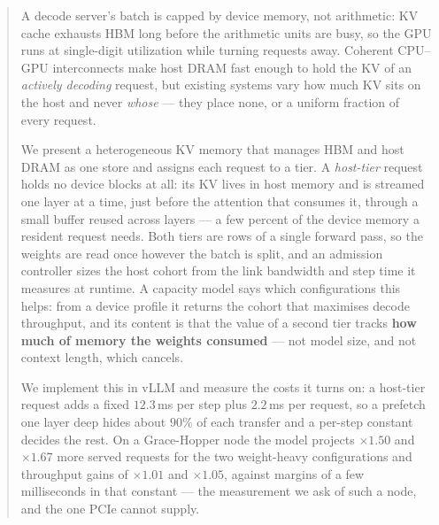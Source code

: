 \begin{abstract}
A decode server's batch is capped by device memory, not arithmetic: KV cache
exhausts HBM long before the arithmetic units are busy, so the GPU runs at
single-digit utilization while turning requests away. Coherent CPU--GPU
interconnects make host DRAM fast enough to hold the KV of an \emph{actively
decoding} request, but existing systems vary how much KV sits on the host and
never \emph{whose} --- they place none, or a uniform fraction of every request.

We present a heterogeneous KV memory that manages HBM and host DRAM as one store
and assigns each request to a tier. A \emph{host-tier} request holds no device
blocks at all: its KV lives in host memory and is streamed one layer at a time,
just before the attention that consumes it, through a small buffer reused across
layers --- a few percent of the device memory a resident request needs. Both tiers
are rows of a single forward pass, so the weights are read once however the batch
is split, and an admission controller sizes the host cohort from the link
bandwidth and step time it measures at runtime. A capacity model says which
configurations this helps: from a device profile it returns the cohort that
maximises decode throughput, and its content is that the value of a second tier
tracks \textbf{how much of memory the weights consumed} --- not model size, and
not context length, which cancels.

We implement this in vLLM and measure the costs it turns on: a host-tier request
adds a fixed $12.3$\,ms per step plus $2.2$\,ms per request, so a prefetch one
layer deep hides about $90\%$ of each transfer and a per-step constant decides the
rest. On a Grace-Hopper node the model projects $\times1.50$ and $\times1.67$ more
served requests for the two weight-heavy configurations and throughput gains of
$\times1.01$ and $\times1.05$, against margins of a few milliseconds in that
constant --- the measurement we ask of such a node, and the one PCIe cannot
supply.
\end{abstract}
